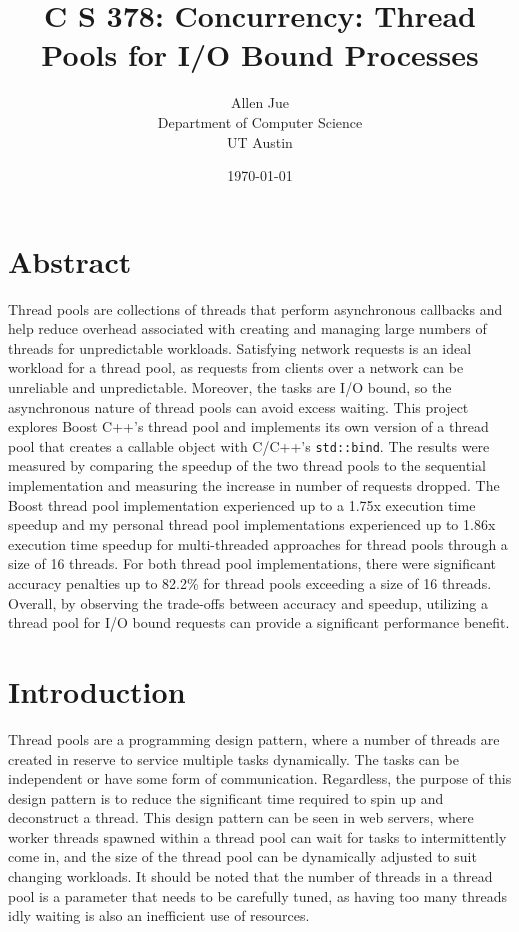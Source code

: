 \documentclass[12pt]{article}
\title{C S 378: Concurrency: Thread Pools for I/O Bound Processes}
\author{
        Allen Jue \\
        Department of Computer Science\\
        UT Austin
}\date{\today}
\begin{document}
\maketitle

\section{Abstract}

Thread pools are collections of threads that perform asynchronous callbacks and help reduce overhead associated with creating and managing large numbers of threads for unpredictable workloads. Satisfying network requests is an ideal workload for a thread pool, as requests from clients over a network can be unreliable and unpredictable. Moreover, the tasks are I/O bound, so the asynchronous nature of thread pools can avoid excess waiting. This project explores Boost C++'s thread pool and implements its own version of a thread pool that creates a callable object with C/C++'s \texttt{std::bind}. The results were measured by comparing the speedup of the two thread pools to the sequential implementation and measuring the increase in number of requests dropped. The Boost thread pool implementation experienced up to a 1.75x execution time speedup and my personal thread pool implementations experienced up to 1.86x execution time speedup for multi-threaded approaches for thread pools through a size of 16 threads. For both thread pool implementations, there were significant accuracy penalties up to 82.2\% for thread pools exceeding a size of 16 threads. Overall, by observing the trade-offs between accuracy and speedup, utilizing a thread pool for I/O bound requests can provide a significant performance benefit.

\section{Introduction}

Thread pools are a programming design pattern, where a number of threads are created in reserve to service multiple tasks dynamically. The tasks can be independent or have some form of communication. Regardless, the purpose of this design pattern is to reduce the significant time required to spin up and deconstruct a thread. This design pattern can be seen in web servers, where worker threads spawned within a thread pool can wait for tasks to intermittently come in, and the size of the thread pool can be dynamically adjusted to suit changing workloads. It should be noted that the number of threads in a thread pool is a parameter that needs to be carefully tuned, as having too many threads idly waiting is also an inefficient use of resources.
\end{document}
